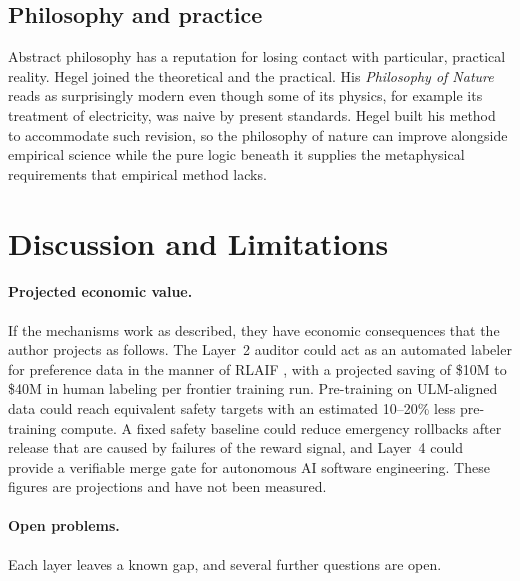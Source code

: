 \documentclass[twocolumn]{ulpaper}
\begin{document}
\subsection{Philosophy and practice}

Abstract philosophy has a reputation for losing contact with particular, practical reality. Hegel joined the theoretical and the practical. His \emph{Philosophy of Nature} \citep{hegel1970nature} reads as surprisingly modern even though some of its physics, for example its treatment of electricity, was naive by present standards. Hegel built his method to accommodate such revision, so the philosophy of nature can improve alongside empirical science while the pure logic beneath it supplies the metaphysical requirements that empirical method lacks.

\section{Discussion and Limitations}
\label{sec:limitations}

\paragraph{Projected economic value.} If the mechanisms work as described, they have economic consequences that the author projects as follows. The Layer~2 auditor could act as an automated labeler for preference data in the manner of RLAIF \citep{lee2023rlaif}, with a projected saving of \$10M to \$40M in human labeling per frontier training run. Pre-training on ULM-aligned data could reach equivalent safety targets with an estimated 10--20\% less pre-training compute. A fixed safety baseline could reduce emergency rollbacks after release that are caused by failures of the reward signal, and Layer~4 could provide a verifiable merge gate for autonomous AI software engineering. These figures are projections and have not been measured.

\paragraph{Open problems.} Each layer leaves a known gap, and several further questions are open.
\end{document}
